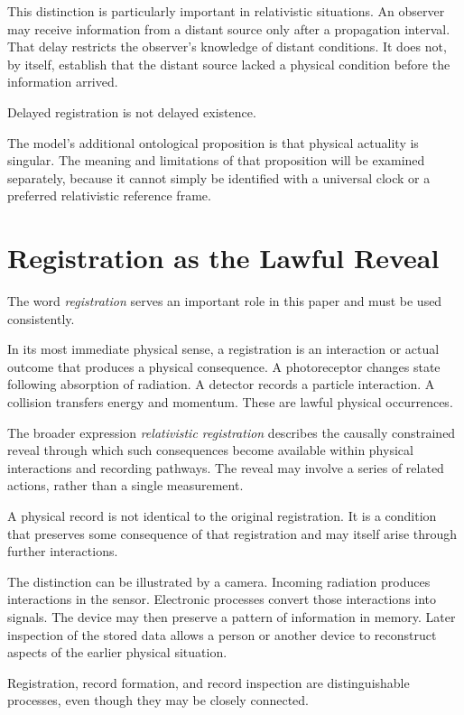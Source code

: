 \documentclass[12pt,onecolumn]{article}
\begin{document}
This distinction is particularly important in relativistic situations. An observer may receive information from a distant source only after a propagation interval. That delay restricts the observer's knowledge of distant conditions. It does not, by itself, establish that the distant source lacked a physical condition before the information arrived.

Delayed registration is not delayed existence.

The model's additional ontological proposition is that physical actuality is singular. The meaning and limitations of that proposition will be examined separately, because it cannot simply be identified with a universal clock or a preferred relativistic reference frame.

\section{Registration as the Lawful Reveal}

The word \emph{registration} serves an important role in this paper and must be used consistently.

In its most immediate physical sense, a registration is an interaction or actual outcome that produces a physical consequence. A photoreceptor changes state following absorption of radiation. A detector records a particle interaction. A collision transfers energy and momentum. These are lawful physical occurrences.

The broader expression \emph{relativistic registration} describes the causally constrained reveal through which such consequences become available within physical interactions and recording pathways. The reveal may involve a series of related actions, rather than a single measurement.

A physical record is not identical to the original registration. It is a condition that preserves some consequence of that registration and may itself arise through further interactions.

The distinction can be illustrated by a camera. Incoming radiation produces interactions in the sensor. Electronic processes convert those interactions into signals. The device may then preserve a pattern of information in memory. Later inspection of the stored data allows a person or another device to reconstruct aspects of the earlier physical situation.

Registration, record formation, and record inspection are distinguishable processes, even though they may be closely connected.
\end{document}
